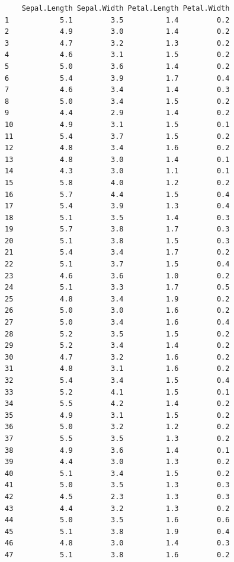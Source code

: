 \documentclass[
  a4paper,
]{ltjsbook}
\begin{document}
\begin{verbatim}
    Sepal.Length Sepal.Width Petal.Length Petal.Width
1            5.1         3.5          1.4         0.2
2            4.9         3.0          1.4         0.2
3            4.7         3.2          1.3         0.2
4            4.6         3.1          1.5         0.2
5            5.0         3.6          1.4         0.2
6            5.4         3.9          1.7         0.4
7            4.6         3.4          1.4         0.3
8            5.0         3.4          1.5         0.2
9            4.4         2.9          1.4         0.2
10           4.9         3.1          1.5         0.1
11           5.4         3.7          1.5         0.2
12           4.8         3.4          1.6         0.2
13           4.8         3.0          1.4         0.1
14           4.3         3.0          1.1         0.1
15           5.8         4.0          1.2         0.2
16           5.7         4.4          1.5         0.4
17           5.4         3.9          1.3         0.4
18           5.1         3.5          1.4         0.3
19           5.7         3.8          1.7         0.3
20           5.1         3.8          1.5         0.3
21           5.4         3.4          1.7         0.2
22           5.1         3.7          1.5         0.4
23           4.6         3.6          1.0         0.2
24           5.1         3.3          1.7         0.5
25           4.8         3.4          1.9         0.2
26           5.0         3.0          1.6         0.2
27           5.0         3.4          1.6         0.4
28           5.2         3.5          1.5         0.2
29           5.2         3.4          1.4         0.2
30           4.7         3.2          1.6         0.2
31           4.8         3.1          1.6         0.2
32           5.4         3.4          1.5         0.4
33           5.2         4.1          1.5         0.1
34           5.5         4.2          1.4         0.2
35           4.9         3.1          1.5         0.2
36           5.0         3.2          1.2         0.2
37           5.5         3.5          1.3         0.2
38           4.9         3.6          1.4         0.1
39           4.4         3.0          1.3         0.2
40           5.1         3.4          1.5         0.2
41           5.0         3.5          1.3         0.3
42           4.5         2.3          1.3         0.3
43           4.4         3.2          1.3         0.2
44           5.0         3.5          1.6         0.6
45           5.1         3.8          1.9         0.4
46           4.8         3.0          1.4         0.3
47           5.1         3.8          1.6         0.2

\end{verbatim}
\end{document}
